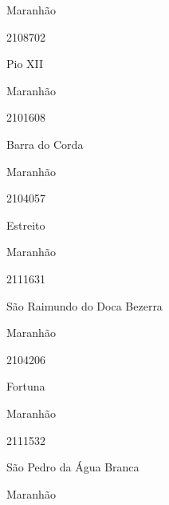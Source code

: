 \documentclass[
  letterpaper,
]{report}
\begin{document}
\n    

\n      

Maranhão

\n      

2108702

\n      

Pio XII

\n    

\n    

\n      

Maranhão

\n      

2101608

\n      

Barra do Corda

\n    

\n    

\n      

Maranhão

\n      

2104057

\n      

Estreito

\n    

\n    

\n      

Maranhão

\n      

2111631

\n      

São Raimundo do Doca Bezerra

\n    

\n    

\n      

Maranhão

\n      

2104206

\n      

Fortuna

\n    

\n    

\n      

Maranhão

\n      

2111532

\n      

São Pedro da Água Branca

\n    

\n    

\n      

Maranhão

\n      
\end{document}
